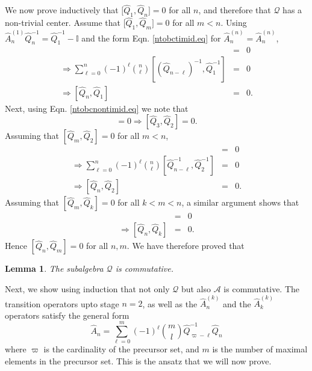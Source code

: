 \documentclass[11pt]{article}
\newtheorem{lemma}[theorem]{Lemma}
\newcommand{\hA}{\hat { A}}
\newcommand{\hQ}{\hat Q}
\newcommand{\cA}{\mathcal A}
\newcommand{\cQ}{\mathcal Q}
\newcommand{\id}{\mathbb I}
\newcommand{\h}{\hat}
\begin{document}
We now prove inductively  that $\bigl[ \hQ_1,\hQ_n \bigr]=0$ for all
$n$, and therefore that  $\cQ$ has a non-trivial center. Assume that  $\bigl[ \hQ_1,\hQ_{m} \bigr]=0$ for all
$m<n$. Using $ \hA_n^{(1)} \hQ_n^{-1}= \hQ_1^{-1}-\id$ and the form
Eqn. \eqref{ntobctimid.eq} 
for $\hA_n^{(n)}=\h A_n^{(n)} $, 
\begin{eqnarray} 
  [\hA_n^{(n)} \hQ_n^{-1}, \hA_n^{(1)}\hQ_n^{-1}] &= & 0 \nonumber \\
  \Rightarrow \sum_{\ell=0}^n (-1)^\ell \binom{n}{\ell} [(\hQ_{n-\ell})^{-1}
  ,  \hQ_1^{-1}] &= & 0 \nonumber \\
   \Rightarrow [\hQ_n,\hQ_1] &=&0. 
\end{eqnarray} 
Next, using Eqn. \eqref{ntobcnontimid.eq} we note  that 
\begin{equation} 
  [\hA_n^{(3)} \hQ_n^{-1}, \hA_n^{(2)}\hQ_n^{-1}]=0 \Rightarrow
  [\hQ_3,\hQ_2] =0. 
\end{equation}
Assuming  that  $[\hQ_m,\hQ_2] =0$ for all $m<n$, 
\begin{eqnarray} 
  [\hA_n^{(n)} \hQ_n^{-1}, \hA_n^{(2)}\hQ_n^{-1}] &=& 0 \nonumber \\
  \Rightarrow \sum_{\ell=0}^{n} (-1)^\ell \binom{n}{\ell}[\hQ_{n-\ell}^{-1}
  ,  \hQ_{2}^{-1}] &=&0 \nonumber \\
  \Rightarrow [\hQ_n,\hQ_2] &=&0. 
\end{eqnarray}
Assuming that $[\hQ_m,\hQ_k] =0$ for all $k<m<n$, a similar argument
shows that 
\begin{eqnarray} 
  [\hA_n^{(n)} \hQ_n^{-1}, \hA_n^{(k)}\hQ_n^{-1}] &=& 0 \nonumber \\
  \Rightarrow [\hQ_n,\hQ_k] &=&0. 
\end{eqnarray}
Hence $[\hQ_n,\hQ_m]=0$ for all $n,m$.  We have therefore proved that 
\begin{lemma}
The subalgebra $\cQ$ is commutative.  
\end{lemma} 

Next, we show  using induction that not only $\cQ$  but also $\cA$ is commutative.  The transition operators
upto stage  $n=2$, as well as the $\hA_n^{(k)}$ and the $\h A_k^{(k)}$ operators satisfy the 
general form 
\begin{equation}
\hA_n= \sum_{\ell=0}^m (-1)^\ell \binom{m}{l} \hQ_{\varpi - \ell}
^{-1} \hQ_n \label{ansatzntobc.eq}
\end{equation} 
where $\varpi$ is the cardinality of the precursor set, and $m$ is
the number of maximal elements in the precursor set. This is the
ansatz that we will now prove.  
\end{document}

